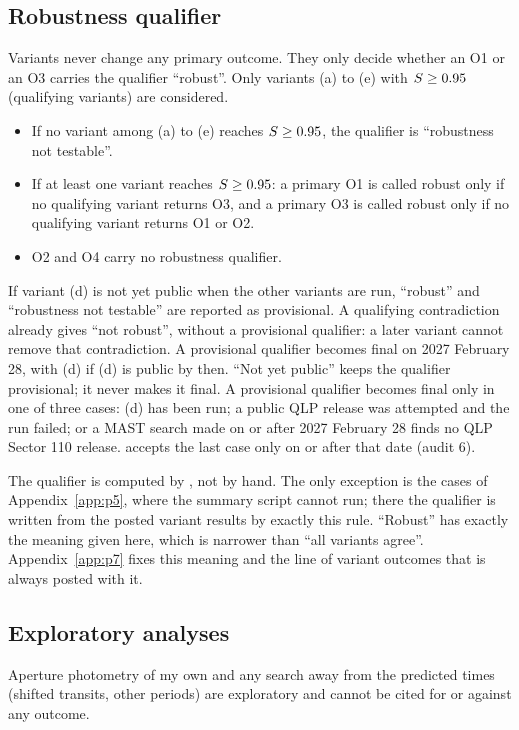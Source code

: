 \subsection{Robustness qualifier} \label{app:robust}

Variants never change any primary outcome. They only decide whether an O1 or an O3 carries the qualifier ``robust''.
Only variants (a) to (e) with $S \geq 0.95$ (qualifying variants) are considered.
\begin{itemize}
\item If no variant among (a) to (e) reaches $S \geq 0.95$, the qualifier is ``robustness not testable''.
\item If at least one variant reaches $S \geq 0.95$: a primary O1 is called robust only if no qualifying variant returns
  O3, and a primary O3 is called robust only if no qualifying variant returns O1 or O2.
\item O2 and O4 carry no robustness qualifier.
\end{itemize}

If variant (d) is not yet public when the other variants are run, ``robust'' and ``robustness not testable'' are
reported as provisional. A qualifying contradiction already gives ``not robust'', without a provisional qualifier:
a later variant cannot remove that contradiction. A provisional qualifier becomes final on 2027 February 28, with
(d) if (d) is public by then. ``Not yet public'' keeps the qualifier provisional; it
never makes it final. A provisional qualifier becomes final only in one of three cases: (d) has been run; a public QLP release
was attempted and the run failed; or a MAST search made on or after 2027 February 28 finds no QLP Sector 110 release.
 accepts the last case only on or after that date (audit 6).

The qualifier is computed by , not by hand. The only exception is the cases of
Appendix~\ref{app:p5}, where the summary script cannot run; there the qualifier is written from the posted variant
results by exactly this rule. ``Robust'' has exactly the meaning given here, which is narrower than ``all variants
agree''. Appendix~\ref{app:p7} fixes this meaning and the line of variant outcomes that is always posted with it.

\subsection{Exploratory analyses}

Aperture photometry of my own and any search away from the predicted times (shifted transits, other periods) are
exploratory and cannot be cited for or against any outcome.
